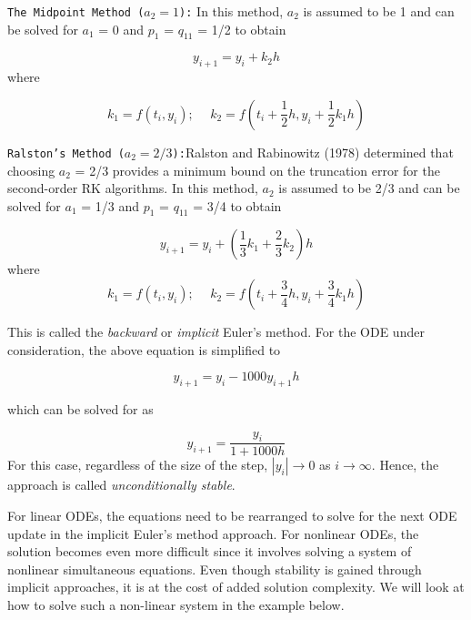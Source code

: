 \documentclass[book.tex]{subfiles}
\begin{document}
\texttt{The Midpoint Method ($a_2 = 1$):}
In this method, $a_2$ is assumed to be 1 and can be solved for $a_1$ = 0 and $p_1$ = $q_{11}$ = 1/2 to obtain

\begin{equation*}
y_{i+1} = y_{i} + k_2h
\end{equation*}
where

\begin{equation*}
		k_1 = f(t_i,y_i); \hspace{15pt}k_2 = f(t_i + \frac{1}{2}h,y_i + \frac{1}{2}k_1h)		
\end{equation*}

\texttt{Ralston's Method ($a_2 = 2/3$):}Ralston and Rabinowitz (1978) determined that choosing $a_2$ = 2/3 provides a minimum bound on the truncation error for the second-order RK algorithms. In this method, $a_2$ is assumed to be 2/3 and can be solved for $a_1$ = 1/3 and $p_1$ = $q_{11}$ = 3/4 to obtain

\begin{equation*}
y_{i+1} = y_{i} + (\frac{1}{3}k_1 + \frac{2}{3}k_2)h
\end{equation*}
where
\begin{equation*}
		k_1 = f(t_i,y_i);\hspace{15pt}	k_2 = f(t_i + \frac{3}{4}h,y_i + \frac{3}{4}k_1h)		
\end{equation*}

This is called the \textit{backward} or \textit{implicit} Euler's method.
For the ODE under consideration, the above equation is simplified to

\begin{equation*}
y_{i+1} = y_i - 1000y_{i+1}h
\end{equation*}

which can be solved for as

\begin{equation*}
y_{i+1} = \dfrac{y_i}{1+1000h}
\end{equation*}
For this case, regardless of the size of the step, $|y_i|\rightarrow0$ as $i\rightarrow \infty$. Hence, the approach is called \textit{unconditionally stable}.


For linear ODEs, the equations need to be rearranged to solve for the next ODE update in the implicit Euler's method approach. For nonlinear ODEs, the solution becomes even more difficult since it involves solving a system of nonlinear simultaneous equations. Even though stability is gained through implicit approaches, it is at the cost of added solution complexity. We will look at how to solve such a non-linear system in the example below.
\end{document}
